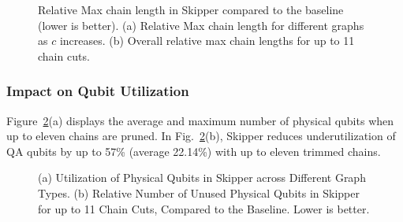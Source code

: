 \begin{figure}[t]
    \captionsetup[subfigure]{position=top} %
    \centering
    \caption{        
        Relative Max chain length in Skipper compared to the baseline (lower is better). 
        (a) Relative Max chain length for different graphs as $c$ increases.
        (b) Overall relative max chain lengths for up to 11 chain cuts.
    }    
    \label{fig:future_relative_max_chaining_cost}
\end{figure}  


\subsubsection{Impact on Qubit Utilization}

Figure~\ref{fig:future_qubit_utilization}(a) displays the average and maximum number of physical qubits when up to eleven chains are pruned. 
In Fig.~\ref{fig:future_qubit_utilization}(b), Skipper reduces underutilization of QA qubits by up to 57\% (average 22.14\%) with up to eleven trimmed chains. 

\begin{figure}[h]
    \captionsetup[subfigure]{position=top} %
    \centering
    \caption{         
        (a) Utilization of Physical Qubits in Skipper across Different Graph Types.
        (b) Relative Number of Unused Physical Qubits in Skipper for up to 11 Chain Cuts, Compared to the Baseline.
Lower is better. 
    }    
    \label{fig:future_qubit_utilization} 
\end{figure}  



